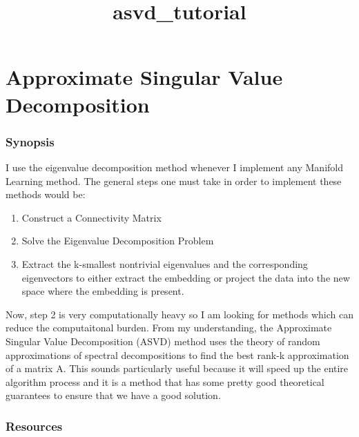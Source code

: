 \documentclass[11pt]{article}
\title{asvd\_tutorial}
\providecommand{\tightlist}{%
      \setlength{\itemsep}{0pt}\setlength{\parskip}{0pt}}
\begin{document}
    
    
    \maketitle
    
    

    
    \hypertarget{approximate-singular-value-decomposition}{%
\section{Approximate Singular Value
Decomposition}\label{approximate-singular-value-decomposition}}

    \hypertarget{synopsis}{%
\subsubsection{Synopsis}\label{synopsis}}

    I use the eigenvalue decomposition method whenever I implement any
Manifold Learning method. The general steps one must take in order to
implement these methods would be:

\begin{enumerate}
\def\labelenumi{\arabic{enumi}.}
\tightlist
\item
  Construct a Connectivity Matrix
\item
  Solve the Eigenvalue Decomposition Problem
\item
  Extract the k-smallest nontrivial eigenvalues and the corresponding
  eigenvectors to either extract the embedding or project the data into
  the new space where the embedding is present.
\end{enumerate}

Now, step 2 is very computationally heavy so I am looking for methods
which can reduce the computaitonal burden. From my understanding, the
Approximate Singular Value Decomposition (ASVD) method uses the theory
of random approximations of spectral decompositions to find the best
rank-k approximation of a matrix A. This sounds particularly useful
because it will speed up the entire algorithm process and it is a method
that has some pretty good theoretical guarantees to ensure that we have
a good solution.

    \hypertarget{resources}{%
\subsubsection{Resources}\label{resources}}
\end{document}
